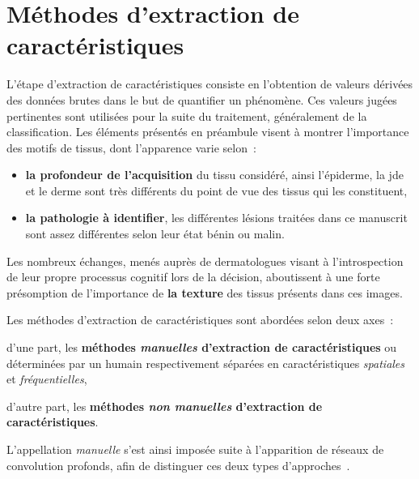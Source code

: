 \newpage

\section{Méthodes d'extraction de caractéristiques}
\label{chap:feature_extraction}
L'étape d'extraction de caractéristiques consiste en l'obtention de valeurs dérivées des données brutes dans le but de quantifier un phénomène. Ces valeurs jugées pertinentes sont utilisées pour la suite du traitement, généralement de la classification. Les éléments présentés en préambule visent à montrer l'importance des motifs de tissus, dont l'apparence varie selon~:
\begin{itemize}
    \item \textbf{la profondeur de l'acquisition} du tissu considéré, ainsi l'épiderme, la \gls{jde} et le derme sont très différents du point de vue des tissus qui les constituent,
    \item \textbf{la pathologie à identifier}, les différentes lésions traitées dans ce manuscrit sont assez différentes selon leur état bénin ou malin.
\end{itemize}
Les nombreux échanges, menés auprès de dermatologues visant à l'introspection de leur propre processus cognitif lors de la décision, aboutissent à une forte présomption de l'importance de \textbf{la texture} des tissus présents dans ces images.\par

Les méthodes d'extraction de caractéristiques sont abordées selon deux axes~:
\begin{inlinerate}
    \item d'une part, les \textbf{méthodes \textit{manuelles} d'extraction de caractéristiques} ou déterminées par un humain respectivement séparées en caractéristiques \textit{spatiales} et \textit{fréquentielles},
    \item d'autre part, les \textbf{méthodes \textit{non manuelles} d'extraction de caractéristiques}.
\end{inlinerate} 
L'appellation \textit{manuelle} s'est ainsi imposée suite à l'apparition de réseaux de convolution profonds, afin de distinguer ces deux types d'approches~\cite{Nanni2017}.\par

